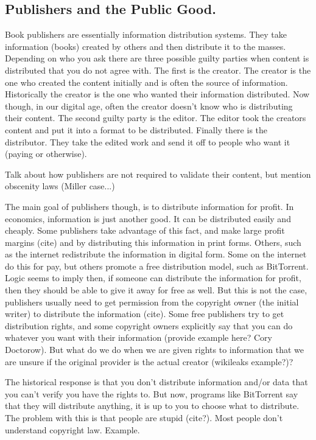 \documentclass[11pt]{article}
\begin{document}
\subsection{Publishers and the Public Good.}

Book publishers are essentially information distribution systems. They take information (books) created by others and then distribute it to the masses. Depending on who you ask there are three possible guilty parties when content is distributed that you do not agree with. The first is the creator. The creator is the one who created the content initially and is often the source of information. Historically the creator is the one who wanted their information distributed. Now though, in our digital age, often the creator doesn't know who is distributing their content. The second guilty party is the editor. The editor took the creators content and put it into a format to be distributed. Finally there is the distributor. They take the edited work and send it off to people who want it (paying or otherwise).

Talk about how publishers are not required to validate their content, but mention obscenity laws (Miller case...)

The main goal of publishers though, is to distribute information for profit. In economics, information is just another good. It can be distributed easily and cheaply. Some publishers take advantage of this fact, and make large profit margins (cite) and by distributing this information in print forms. Others, such as the internet redistribute the information in digital form. Some on the internet do this for pay, but others promote a free distribution model, such as BitTorrent. Logic seems to imply then, if someone can distribute the information for profit, then they should be able to give it away for free as well. But this is not the case, publishers usually need to get permission from the copyright owner (the initial writer) to distribute the information (cite). Some free publishers try to get distribution rights, and some copyright owners explicitly say that you can do whatever you want with their information (provide example here? Cory Doctorow). But what do we do when we are given rights to information that we are unsure if the original provider is the actual creator (wikileaks example?)?

The historical response is that you don't distribute information and/or data that you can't verify you have the rights to. But now, programs like BitTorrent say that they will distribute anything, it is up to you to choose what to distribute. The problem with this is that people are stupid (cite?). Most people don't understand copyright law. Example.
\end{document}
